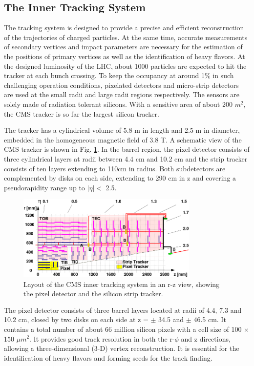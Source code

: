 \documentclass[thesis.tex]{subfiles}
\begin{document}
\subsection{The Inner Tracking System}
The tracking system is designed to provide a precise and efficient reconstruction of the trajectories of charged particles. 
At the same time, accurate measurements of secondary vertices and impact parameters are necessary for the estimation of the positions of primary vertices as well as the identification of heavy flavors. 
At the designed luminosity of the LHC, about 1000 particles are expected to hit the tracker at each bunch crossing. 
To keep the occupancy at around 1\% in such challenging operation conditions, pixelated detectors and micro-strip detectors are used at the small radii and large radii regions respectively. 
The sensors are solely made of radiation tolerant silicons. With a sensitive area of about 200 $m^2$, the CMS tracker is so far the largest silicon tracker.  

The tracker has a cylindrical volume of 5.8 m in length and 2.5 m in diameter, embedded in the homogeneous magnetic field of 3.8 T. 
A schematic view of the CMS tracker is shown in Fig. \ref{fig:tracker}. 
In the barrel region, the pixel detector consists of three cylindrical layers at radii between 4.4 cm and 10.2 cm and the strip tracker consists of ten layers extending to 110cm in radius. 
Both subdetectors are complemented by disks on each side, extending to 290 cm in z and covering a pseudorapidity range up to $|\eta| <$ 2.5. 

\begin{figure}[!htb]
	\centering
	\includegraphics[width=0.8\textwidth]{plot/tracker.png}
	\caption{Layout of the CMS inner tracking system in an r-z view, showing the pixel detector and the silicon strip tracker.}
	\label{fig:tracker}
\end{figure}


The pixel detector consists of three barrel layers located at radii of 4.4, 7.3 and 10.2 cm, closed by two disks on each side at z = $\pm$ 34.5 and $\pm$ 46.5 cm. 
It contains a total number of about 66 million silicon pixels with a cell size of 100 $\times$150 $\mu m^2$. 
It provides good track resolution in both the r-$\phi$ and z directions, allowing a three-dimensional (3-D) vertex reconstruction. 
It is essential for the identification of heavy flavors and forming seeds for the track finding.
\end{document}
